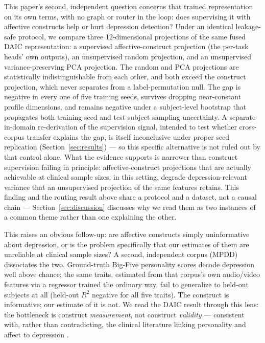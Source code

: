\documentclass[twocolumn]{article}
\begin{document}
This paper's second, independent question concerns that trained representation on its own terms, with no graph or router in the loop: does supervising it with affective constructs help or hurt depression detection? Under an identical leakage-safe protocol, we compare three 12-dimensional projections of the same fused DAIC representation: a supervised affective-construct projection (the per-task heads' own outputs), an unsupervised random projection, and an unsupervised variance-preserving PCA projection. The random and PCA projections are statistically indistinguishable from each other, and both exceed the construct projection, which never separates from a label-permutation null. The gap is negative in every one of five training seeds, survives dropping near-constant profile dimensions, and remains negative under a subject-level bootstrap that propagates both training-seed and test-subject sampling uncertainty. A separate in-domain re-derivation of the supervision signal, intended to test whether cross-corpus transfer explains the gap, is itself inconclusive under proper seed replication (Section~\ref{sec:results}) — so this specific alternative is not ruled out by that control alone. What the evidence supports is narrower than construct supervision failing in principle: affective-construct projections that are actually achievable at clinical sample sizes, in this setting, degrade depression-relevant variance that an unsupervised projection of the same features retains. This finding and the routing result above share a protocol and a dataset, not a causal chain — Section~\ref{sec:discussion} discusses why we read them as two instances of a common theme rather than one explaining the other.

This raises an obvious follow-up: are affective constructs simply uninformative about depression, or is the problem specifically that our estimates of them are unreliable at clinical sample sizes? A second, independent corpus (MPDD) dissociates the two. Ground-truth Big-Five personality scores decode depression well above chance; the same traits, estimated from that corpus's own audio/video features via a regressor trained the ordinary way, fail to generalize to held-out subjects at all (held-out $R^2$ negative for all five traits). The construct is informative; our estimate of it is not. We read the DAIC result through this lens: the bottleneck is construct \emph{measurement}, not construct \emph{validity} — consistent with, rather than contradicting, the clinical literature linking personality and affect to depression \citep{kotov2010linking,clark1991tripartite}.
\end{document}
